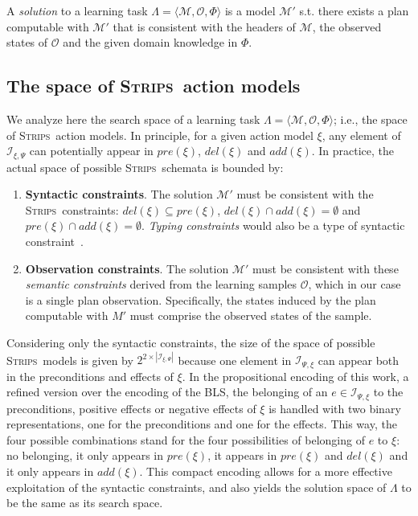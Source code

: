 \documentclass{article}
\newcommand{\tup}[1]{{\langle #1 \rangle}}
\newcommand{\strips}{\textsc{Strips}}
\begin{document}
A {\em solution} to a learning task $\Lambda=\tup{\mathcal{M},{\mathcal O},\Phi}$ is a model $\mathcal{M}'$ s.t. there exists a plan computable with $\mathcal{M}'$ that is consistent with the headers of $\mathcal{M}$, the observed states of $\mathcal{O}$ and the given domain knowledge in $\Phi$.

\subsection{The space of \strips\ action models}

We analyze here the search space of a learning task $\Lambda=\tup{\mathcal{M},{\mathcal O},\Phi}$; i.e., the space of \strips\ action models. In principle, for a given action model $\xi$, any element of ${\mathcal I}_{\xi,\Psi}$ can potentially appear in $pre(\xi)$, $del(\xi)$ and $add(\xi)$. In practice, the actual space of possible \strips\ schemata is bounded by:

\begin{enumerate}
\item {\bf Syntactic constraints}. The solution $\mathcal{M}'$ must be consistent with the \strips\ constraints: $del(\xi)\subseteq pre(\xi)$, $del(\xi)\cap add(\xi)=\emptyset$ and $pre(\xi)\cap add(\xi)=\emptyset$. {\em Typing constraints} would also be a type of syntactic constraint~\cite{mcdermott1998pddl}.
\item {\bf Observation constraints}. The solution $\mathcal{M}'$ must be consistent with these \emph{semantic constraints} derived from  the learning samples $\mathcal{O}$, which in our case is a single plan observation. Specifically, the states induced by the plan computable with $M'$ must comprise the observed states of the sample.
\end{enumerate}

Considering only the syntactic constraints, the size of the space of possible \strips\ models is given by $2^{2\times|{\mathcal I}_{\xi,\Psi}|}$ because one element in $\mathcal{I}_{\Psi,\xi}$ can appear both in the preconditions and effects of $\xi$. In the propositional encoding of this work, a refined version over the encoding of the BLS, the belonging of an $e \in \mathcal{I}_{\Psi,\xi}$ to the preconditions, positive effects or negative effects of $\xi$ is handled with two binary representations, one for the preconditions and one for the effects. This way, the four possible combinations stand for the four possibilities of belonging of $e$ to $\xi$: no belonging, it only appears in $pre(\xi)$, it appears in $pre(\xi)$ and $del(\xi)$ and it only appears in $add(\xi)$. This compact encoding allows for a more effective exploitation of the syntactic constraints, and also yields the solution space of $\Lambda$ to be the same as its search space.
\end{document}
